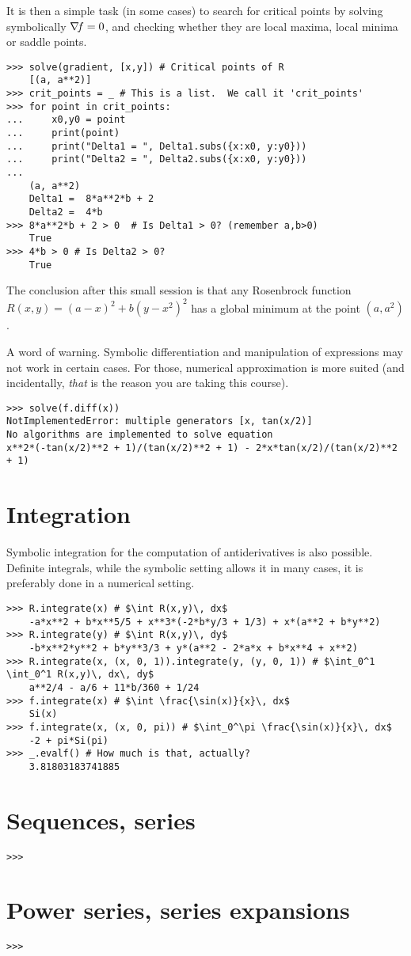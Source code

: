 It is then a simple task (in some cases) to search for critical points by solving symbolically $\mathop{\nabla\! {f}}=0$, and checking whether they are local maxima, local minima or saddle points.
\begin{verbatim}
>>> solve(gradient, [x,y]) # Critical points of R
	[(a, a**2)]
>>> crit_points = _ # This is a list.  We call it 'crit_points' 
>>> for point in crit_points:
...     x0,y0 = point
...     print(point)
...     print("Delta1 = ", Delta1.subs({x:x0, y:y0}))
...     print("Delta2 = ", Delta2.subs({x:x0, y:y0}))
...
	(a, a**2)
	Delta1 =  8*a**2*b + 2
	Delta2 =  4*b
>>> 8*a**2*b + 2 > 0  # Is Delta1 > 0? (remember a,b>0)
	True
>>> 4*b > 0 # Is Delta2 > 0?
	True
\end{verbatim}
The conclusion after this small session is that any Rosenbrock function $R(x,y) = (a-x)^2 + b(y-x^2)^2$ has a global minimum at the point $(a,a^2)$.

A word of warning.  Symbolic differentiation and manipulation of expressions may not work in certain cases.  For those, numerical approximation is more suited (and incidentally, \emph{that} is the reason you are taking this course).

\begin{verbatim}
>>> solve(f.diff(x))
NotImplementedError: multiple generators [x, tan(x/2)]
No algorithms are implemented to solve equation 
x**2*(-tan(x/2)**2 + 1)/(tan(x/2)**2 + 1) - 2*x*tan(x/2)/(tan(x/2)**2 + 1)
\end{verbatim}

\section{Integration}

Symbolic integration for the computation of antiderivatives is also possible.  Definite integrals, while the symbolic setting allows it in many cases, it is preferably done in a numerical setting.

\begin{verbatim}
>>> R.integrate(x) # $\int R(x,y)\, dx$
	-a*x**2 + b*x**5/5 + x**3*(-2*b*y/3 + 1/3) + x*(a**2 + b*y**2)
>>> R.integrate(y) # $\int R(x,y)\, dy$
	-b*x**2*y**2 + b*y**3/3 + y*(a**2 - 2*a*x + b*x**4 + x**2)
>>> R.integrate(x, (x, 0, 1)).integrate(y, (y, 0, 1)) # $\int_0^1 \int_0^1 R(x,y)\, dx\, dy$
	a**2/4 - a/6 + 11*b/360 + 1/24
>>> f.integrate(x) # $\int \frac{\sin(x)}{x}\, dx$
	Si(x)
>>> f.integrate(x, (x, 0, pi)) # $\int_0^\pi \frac{\sin(x)}{x}\, dx$
	-2 + pi*Si(pi)
>>> _.evalf() # How much is that, actually?
	3.81803183741885
\end{verbatim}

\section{Sequences, series}

\begin{verbatim}
>>> 
\end{verbatim}

\section{Power series, series expansions}
\begin{verbatim}
>>> 
\end{verbatim}